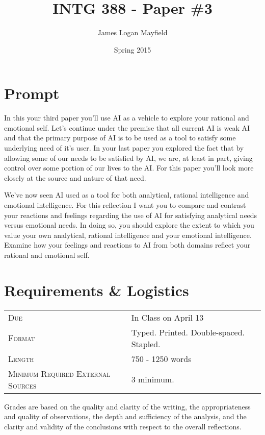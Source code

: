 \documentclass[]{tufte-handout}
\title{INTG 388 - Paper \#3 }
\author{James Logan Mayfield}
\date{ Spring 2015 }
\begin{document}
\maketitle

\section{Prompt}


In this your third paper you'll use AI as a vehicle to explore your rational and emotional self.  Let's continue under the premise that all current AI is weak AI and that the primary purpose of AI is to be used as a tool to satisfy some underlying need of it's user. In your last paper you explored the fact that by allowing some of our needs to be satisfied by AI, we are, at least in part, giving control over some portion of our lives to the AI.  For this paper you'll look more closely at the source and nature of that need. 

We've now seen AI used as a tool for both analytical, rational intelligence and emotional intelligence. For this reflection I want you to compare and contrast your reactions and feelings regarding the use of AI for satisfying analytical needs versus emotional needs.  In doing so, you should explore the extent to which you value your own analytical, rational intelligence and your emotional intelligence. Examine how your feelings and reactions to AI from both domains reflect your rational and emotional self. 

\section{Requirements \& Logistics}

\begin{tabular}{ll}
\textsc{Due} & In Class on April 13  \\
\textsc{Format} & Typed. Printed. Double-spaced. Stapled. \\
\textsc{Length} & 750 - 1250 words \\
\textsc{Minimum Required External Sources} & 3 minimum.  
\end{tabular}

\vspace{.1in}
Grades are based on the quality and clarity of the writing, the appropriateness and quality of observations, the depth and sufficiency of the analysis, and the clarity and validity of the conclusions with respect to the overall reflections.  
\end{document}
